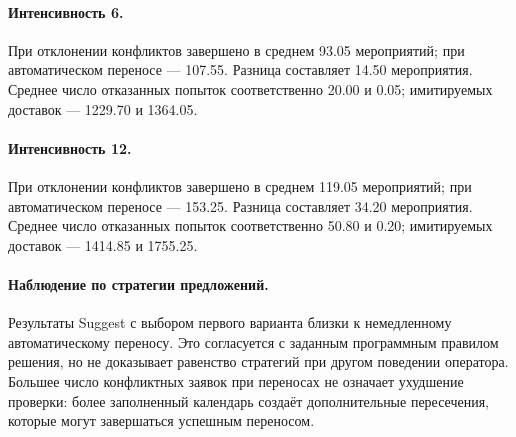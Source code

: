 \paragraph{Интенсивность 6.} При отклонении конфликтов завершено в среднем 93.05 мероприятий; при автоматическом переносе --- 107.55. Разница составляет 14.50 мероприятия. Среднее число отказанных попыток соответственно 20.00 и 0.05; имитируемых доставок --- 1229.70 и 1364.05.

\paragraph{Интенсивность 12.} При отклонении конфликтов завершено в среднем 119.05 мероприятий; при автоматическом переносе --- 153.25. Разница составляет 34.20 мероприятия. Среднее число отказанных попыток соответственно 50.80 и 0.20; имитируемых доставок --- 1414.85 и 1755.25.

\paragraph{Наблюдение по стратегии предложений.} Результаты Suggest с выбором первого варианта близки к немедленному автоматическому переносу. Это согласуется с заданным программным правилом решения, но не доказывает равенство стратегий при другом поведении оператора. Большее число конфликтных заявок при переносах не означает ухудшение проверки: более заполненный календарь создаёт дополнительные пересечения, которые могут завершаться успешным переносом.

